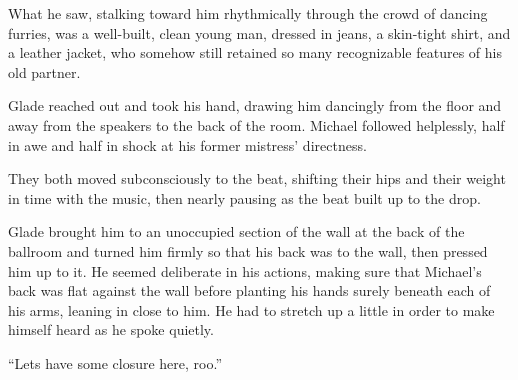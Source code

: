 What he saw, stalking toward him rhythmically through the crowd of dancing furries, was a well-built, clean young man, dressed in jeans, a skin-tight shirt, and a leather jacket, who somehow still retained so many recognizable features of his old partner.

Glade reached out and took his hand, drawing him dancingly from the floor and away from the speakers to the back of the room.  Michael followed helplessly, half in awe and half in shock at his former mistress' directness.

They both moved subconsciously to the beat, shifting their hips and their weight in time with the music, then nearly pausing as the beat built up to the drop.

Glade brought him to an unoccupied section of the wall at the back of the ballroom and turned him firmly so that his back was to the wall, then pressed him up to it.  He seemed deliberate in his actions, making sure that Michael's back was flat against the wall before planting his hands surely beneath each of his arms, leaning in close to him.  He had to stretch up a little in order to make himself heard as he spoke quietly.

``Lets have some closure here, roo.''
